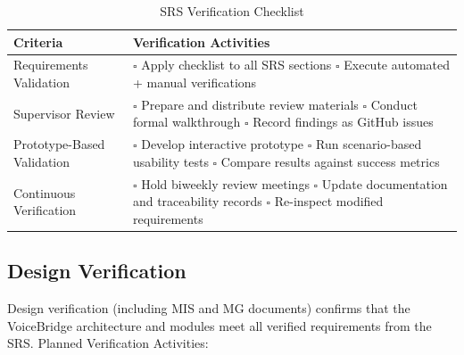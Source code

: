 \documentclass[12pt, titlepage]{article}
\begin{document}
\begin{table}[H]
\centering
\caption{SRS Verification Checklist}
\renewcommand{\arraystretch}{1.3}
\begin{tabular}{|p{5cm}|p{9cm}|}
\hline
\textbf{Criteria} & \textbf{Verification Activities} \\ \hline

Requirements Validation &
\(\square\) Apply checklist to all SRS sections \newline
\(\square\) Execute automated + manual verifications \\ \hline

Supervisor Review &
\(\square\) Prepare and distribute review materials \newline
\(\square\) Conduct formal walkthrough \newline
\(\square\) Record findings as GitHub issues \\ \hline

Prototype-Based Validation &
\(\square\) Develop interactive prototype \newline
\(\square\) Run scenario-based usability tests \newline
\(\square\) Compare results against success metrics \\ \hline

Continuous Verification &
\(\square\) Hold biweekly review meetings \newline
\(\square\) Update documentation and traceability records \newline
\(\square\) Re-inspect modified requirements \\ \hline

\end{tabular}
\end{table}


\subsection{Design Verification}

Design verification (including MIS and MG documents) confirms that the VoiceBridge architecture and modules meet all verified requirements from the SRS. Planned Verification Activities:
\end{document}
